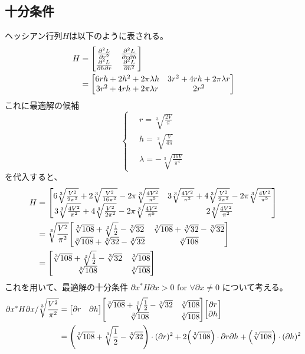 \documentclass{jsarticle}
\begin{document}
\subsection{十分条件}
ヘッシアン行列$H$は以下のように表される。
\begin{align}
  H &=
  \mqty[
  \pdv[2]{L}{r} & \pdv{L}{r}{h} \\
  \pdv{L}{h}{r} & \pdv[2]{L}{h} \\
  ]
  \\&=
  \mqty[
  6rh+2h^2+2\pi\lambda h & 3r^2+4rh+2\pi\lambda r \\
  3r^2+4rh+2\pi\lambda r & 2r^2 \\
  ]
\end{align}
これに最適解の候補
\begin{equation}
  \left\{ \,
  \begin{aligned}
     & r = \sqrt[3]{\frac{2V}{\pi}} \\
     & h = \sqrt[3]{\frac{V}{4\pi}} \\
     & \lambda = -\sqrt[3]{\frac{16V}{\pi^4}}
  \end{aligned}
  \right.
  \label{eq:canditate}
\end{equation}
を代入すると、
\begin{align}
  H&=
  \mqty[
  6\sqrt[3]{\frac{V^2}{2\pi^2}} + 2\sqrt[3]{\frac{V^2}{16\pi^2}} - 2\pi\sqrt[3]{\frac{4V^2}{\pi^5}} &
  3\sqrt[3]{\frac{4V^2}{\pi^2}} + 4\sqrt[3]{\frac{V^2}{2\pi^2}} - 2\pi\sqrt[3]{\frac{4V^2}{\pi^5}} \\
  3\sqrt[3]{\frac{4V^2}{\pi^2}} + 4\sqrt[3]{\frac{V^2}{2\pi^2}} - 2\pi\sqrt[3]{\frac{4V^2}{\pi^5}} &
  2\sqrt[3]{\frac{4V^2}{\pi^2}}
  ]\\
  &= \sqrt[3]{\frac{V^2}{\pi^2}}
  \mqty[
  \sqrt[3]{108} + \sqrt[3]{\frac{1}{2}} - \sqrt[3]{32} &
  \sqrt[3]{108} + \sqrt[3]{32} - \sqrt[3]{32} \\
  \sqrt[3]{108} + \sqrt[3]{32} - \sqrt[3]{32} &
  \sqrt[3]{108}
  ]\\
  &=
  \mqty[
  \sqrt[3]{108} + \sqrt[3]{\frac{1}{2}} - \sqrt[3]{32} &
  \sqrt[3]{108} \\
  \sqrt[3]{108} &
  \sqrt[3]{108}
  ]
  \label{eq:H-val}
\end{align}
これを用いて、最適解の十分条件
$\partial{x}^*H\partial{x}>0 \text{ for }\forall\partial x\neq 0$
について考える。
\begin{align}
  \partial{x}^*H\partial{x}
  / \sqrt[3]{\frac{V^2}{\pi^2}}
  &= 
  \mqty[\partial{r} & \partial{h}]
  \mqty[
  \sqrt[3]{108} + \sqrt[3]{\frac{1}{2}} - \sqrt[3]{32} &
  \sqrt[3]{108} \\
  \sqrt[3]{108} &
  \sqrt[3]{108}
  ]
  \mqty[\partial{r} \\ \partial{h}] \\
  &=
  \qty(\sqrt[3]{108} + \sqrt[3]{\frac{1}{2}} - \sqrt[3]{32}) \cdot (\partial{r})^2
  + 2\qty(\sqrt[3]{108}) \cdot \partial{r}\partial{h}
  + \qty(\sqrt[3]{108}) \cdot (\partial{h})^2
\end{align}
\end{document}
